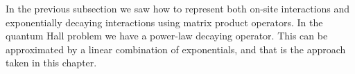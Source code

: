 In the previous subsection we saw how to represent both on-site interactions and exponentially decaying interactions using matrix product operators. In the quantum Hall problem we have a power-law decaying operator. This can be approximated by a linear combination of exponentials, and that is the approach taken in this chapter\cite{ZaletelQHdmrg13}. 





